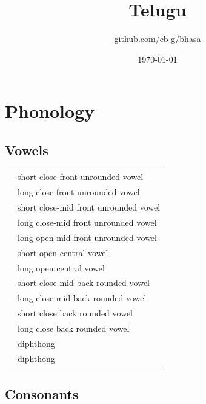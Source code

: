 \documentclass{article}
\title{Telugu\\\ipa{["telugu]}}
\author{\href{https://github.com/cb-g/bhasa}{github.com/cb-g/bhasa}}
\date{\today}
\begin{document}
\pagecolor{custom_bg}\color{custom_fg}
\maketitle\thispagestyle{empty}

\newpage\setcounter{page}{1}\section{Phonology}

\subsection{Vowels}

\begin{xltabular}{\textwidth}{lL}
   & short close front unrounded vowel \\
   & long close front unrounded vowel \\
   & short close-mid front unrounded vowel \\
   & long close-mid front unrounded vowel \\
   & long open-mid front unrounded vowel \\
   & short open central vowel \\
   & long open central vowel \\
   & short close-mid back rounded vowel \\
   & long close-mid back rounded vowel \\
   & short close back rounded vowel \\
   & long close back rounded vowel \\
   & diphthong \\
   & diphthong \\
\end{xltabular}

\subsection{Consonants}
\end{document}
